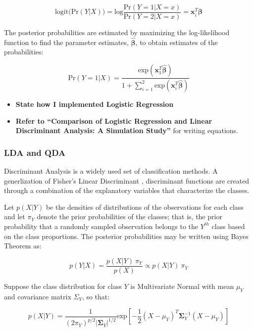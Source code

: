 \documentclass[12pt,]{article}
\providecommand{\tightlist}{%
  \setlength{\itemsep}{0pt}\setlength{\parskip}{0pt}}
\begin{document}
\[
\text{logit} \Big( \text{Pr}(Y \vert X) \Big) = \text{log} \frac{ \text{Pr}(Y=1 \vert X=x) }{ \text{Pr}(Y=2 \vert X=x) }  = \mathbf{x}^T_i\boldsymbol{\beta}  
\]

The posterior probabilities are estimated by maximizing the
log-likelihood function to find the parameter estimates,
\(\hat{\boldsymbol{\beta}}\), to obtain estimates of the probabilities:

\[
\text{Pr}(Y=1 \vert X) = \frac{ \text{exp}(\mathbf{x}^T_1 \hat{\boldsymbol{\beta}}) }{ 1 + \sum^2_{i=1} \text{exp}(\mathbf{x}^T_i \hat{\boldsymbol{\beta}}) }
\]

\begin{itemize}
\tightlist
\item
  \textbf{State how I implemented Logistic Regression}\\
\item
  \textbf{Refer to ``Comparison of Logistic Regression and Linear
  Discriminant Analysis: A Simulation Study''} for writing equations.
\end{itemize}

\subsubsection{LDA and QDA}\label{lda-and-qda}

Discriminant Analysis is a widely used set of classification methods. A
generlization of Fisher's Linear Discriminant
\autocite{fisher_use_1936}, discriminant functions are created through a
combination of the explanatory variables that characterize the classes.

Let \(p(X \vert Y)\) be the densities of distributions of the
observations for each class and let \(\pi_Y\) denote the prior
probabilities of the classes; that is, the prior probability that a
randomly sampled observation belongs to the \(Y^{th}\) class based on
the class proportions. The posterior probabilities may be written using
Bayes Theorem as:

\[
p(Y \vert X) = \frac{p(X \vert Y) ~\pi_Y}{p(X)} \propto p(X \vert Y) ~\pi_Y   \tag{1}
\]

Suppose the class distribution for class \(Y\) is Multivariate Normal
with mean \(\mu_Y\) and covariance matrix \(\Sigma_Y\), so that:

\[
p(X \vert Y) = \frac{1}{(2 \pi_Y)^{p/2} \vert\boldsymbol{\Sigma}_Y\vert ^{1/2}} \text{exp} \left[-\frac{1}{2}(X - \mu_Y)^T \boldsymbol{\Sigma}^{-1}_Y(X - \mu_Y)  \right]  \tag{2}
\]
\end{document}
